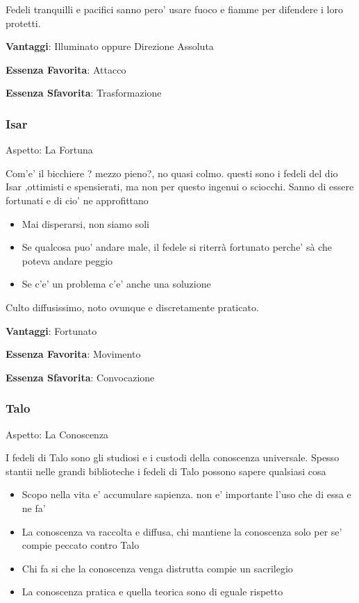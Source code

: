 \documentclass[a4paper,11pt,twoside,openany]{book}
\begin{document}
Fedeli tranquilli e pacifici sanno pero' usare fuoco e fiamme per difendere i loro protetti.

\textbf{Vantaggi}: Illuminato oppure Direzione Assoluta

\textbf{Essenza Favorita}: Attacco

\textbf{Essenza Sfavorita}: Trasformazione
\bigskip

\subsubsection{Isar}

Aspetto: La Fortuna
\bigskip

Com'e' il bicchiere ? mezzo pieno?, no quasi colmo. questi sono i fedeli del dio Isar ,ottimisti e spensierati, ma non per questo ingenui o sciocchi. Sanno di essere fortunati e di cio' ne approfittano

\begin{itemize}
	\item Mai disperarsi, non siamo soli 
	\item Se qualcosa puo' andare male, il fedele si riterrà fortunato perche' sà che poteva andare peggio
	\item Se c'e' un problema c'e' anche una soluzione
\end{itemize}


Culto diffusissimo, noto ovunque e discretamente praticato.


\textbf{Vantaggi}: Fortunato

\textbf{Essenza Favorita}: Movimento

\textbf{Essenza Sfavorita}: Convocazione

\bigskip

\subsubsection{Talo}

Aspetto: La Conoscenza
\bigskip

I fedeli di Talo sono gli studiosi e i custodi della conoscenza universale. Spesso stantii nelle grandi biblioteche i fedeli di Talo possono sapere qualsiasi cosa


\begin{itemize}
	\item Scopo nella vita e' accumulare sapienza. non e' importante l'uso che di essa e ne fa'
	\item La conoscenza va raccolta e diffusa, chi mantiene la conoscenza solo per se' compie peccato contro Talo
	\item Chi fa si che la conoscenza venga distrutta compie un sacrilegio
	\item La conoscenza pratica e quella teorica sono di eguale rispetto
\end{itemize}
\end{document}
